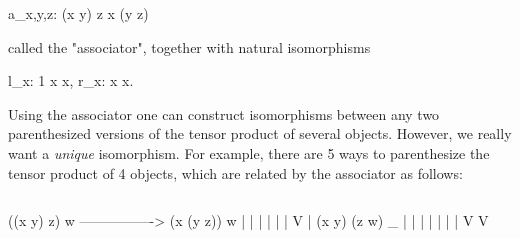 a_{x,y,z}: (x \otimes  y) \otimes  z \to  x \otimes  (y \otimes  z)  

called the "associator", together with natural isomorphisms

            l_{x}: 1 \otimes  x \to  x, 
            r_{x}: x  \to  x. 

Using the associator one can construct isomorphisms between any two
parenthesized versions of the tensor product of several objects.
However, we really want a \emph{unique} isomorphism.  For example, there
are 5 ways to parenthesize the tensor product of 4 objects, which are
related by the associator as follows:


$$

((x \otimes  y) \otimes  z) \otimes  w ----------------> (x \otimes  (y \otimes  z)) \otimes  w
         |                                   |
         |                                   |
         |                                   |
         V                                   |
(x \otimes  y) \otimes  (z \otimes  w)   _{  }                       |
         |                                   |
         |                                   |
         |                                   |
         V                                   V
